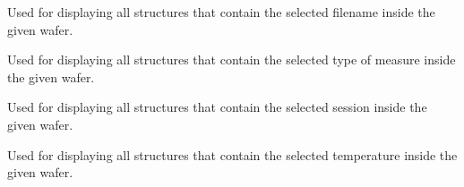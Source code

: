 \documentclass[letterpaper,10pt,english]{sphinxmanual}
\begin{document}

\begin{fulllineitems}
\label{\detokenize{app:app.filter_by_Filenames}}
\pysigstartsignatures
{}
\pysigstopsignatures
\sphinxAtStartPar
Used for displaying all structures that contain the selected filename inside the given wafer.

\end{fulllineitems}


\begin{fulllineitems}
\label{\detokenize{app:app.filter_by_Meas}}
\pysigstartsignatures
{}
\pysigstopsignatures
\sphinxAtStartPar
Used for displaying all structures that contain the selected type of measure inside the given wafer.

\end{fulllineitems}


\begin{fulllineitems}
\label{\detokenize{app:app.filter_by_Session}}
\pysigstartsignatures
{}
\pysigstopsignatures
\sphinxAtStartPar
Used for displaying all structures that contain the selected session inside the given wafer.

\end{fulllineitems}


\begin{fulllineitems}
\label{\detokenize{app:app.filter_by_Temps}}
\pysigstartsignatures
{}
\pysigstopsignatures
\sphinxAtStartPar
Used for displaying all structures that contain the selected temperature inside the given wafer.

\end{fulllineitems}
\end{document}
